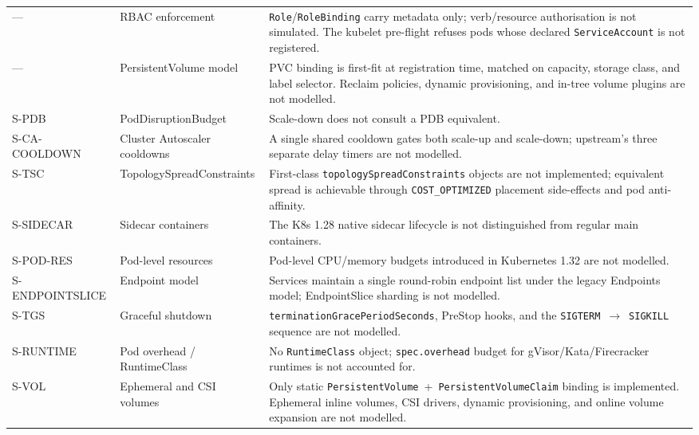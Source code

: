 \documentclass[ASNA,twocolumn]{USG}
\begin{document}
\begin{table}[!t]
\begin{tabular*}{\textwidth}{@{\extracolsep{\fill}}@{}l p{} p{}@{}}
\addlinespace
---             & RBAC enforcement              & \texttt{Role}/\texttt{RoleBinding} carry metadata only; verb/resource authorisation is not simulated. The kubelet pre-flight refuses pods whose declared \texttt{ServiceAccount} is not registered. \\
\addlinespace
---             & PersistentVolume model        & PVC binding is first-fit at registration time, matched on capacity, storage class, and label selector. Reclaim policies, dynamic provisioning, and in-tree volume plugins are not modelled. \\
\addlinespace
S-PDB           & PodDisruptionBudget           & Scale-down does not consult a PDB equivalent. \\
\addlinespace
S-CA-COOLDOWN   & Cluster Autoscaler cooldowns  & A single shared cooldown gates both scale-up and scale-down; upstream's three separate delay timers are not modelled. \\
\addlinespace
S-TSC           & TopologySpreadConstraints     & First-class \texttt{topologySpreadConstraints} objects are not implemented; equivalent spread is achievable through \texttt{COST\_OPTIMIZED} placement side-effects and pod anti-affinity. \\
\addlinespace
S-SIDECAR       & Sidecar containers            & The K8s 1.28 native sidecar lifecycle is not distinguished from regular main containers. \\
\addlinespace
S-POD-RES       & Pod-level resources           & Pod-level CPU/memory budgets introduced in Kubernetes 1.32 are not modelled. \\
\addlinespace
S-ENDPOINTSLICE & Endpoint model                & Services maintain a single round-robin endpoint list under the legacy Endpoints model; EndpointSlice sharding is not modelled. \\
\addlinespace
S-TGS           & Graceful shutdown             & \texttt{terminationGracePeriodSeconds}, PreStop hooks, and the \texttt{SIGTERM}~$\to$~\texttt{SIGKILL} sequence are not modelled. \\
\addlinespace
S-RUNTIME       & Pod overhead / RuntimeClass   & No \texttt{RuntimeClass} object; \texttt{spec.overhead} budget for gVisor/Kata/Firecracker runtimes is not accounted for. \\
\addlinespace
S-VOL           & Ephemeral and CSI volumes     & Only static \texttt{PersistentVolume}~+~\texttt{PersistentVolumeClaim} binding is implemented. Ephemeral inline volumes, CSI drivers, dynamic provisioning, and online volume expansion are not modelled. \\

\end{tabular*}
\end{table}
\end{document}
